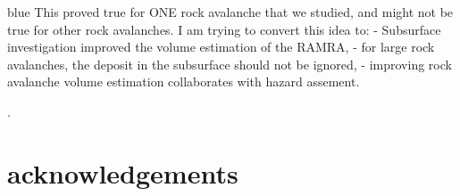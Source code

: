 \documentclass[5p]{elsarticle}
\newcommand{\COMON}{\begin{color}{blue}}
\newcommand{\COMOFF}{\end{color}}
\begin{document}
     \COMON 
     This proved true for ONE rock avalanche that we studied, and might not be true for other rock avalanches. I am trying to convert this idea to:
     - Subsurface investigation improved the volume estimation of the RAMRA,
     - for large rock avalanches, the deposit in the subsurface should not be ignored,
     - improving rock avalanche volume estimation collaborates with hazard assement. 
      \COMOFF. 

	


\section{acknowledgements}







\end{document}
